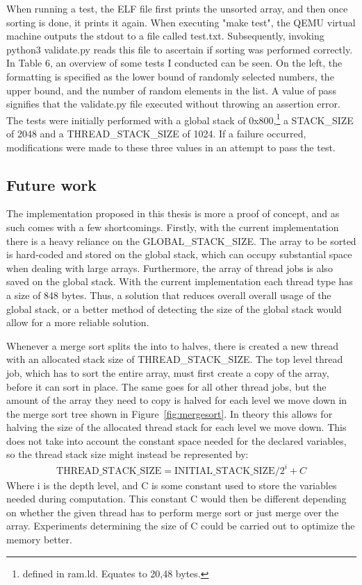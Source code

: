 When running a test, the ELF file first prints the unsorted array, and then once
sorting is done, it prints it again. When executing "make test", the QEMU
virtual machine outputs the stdout to a file called test.txt. Subsequently,
invoking python3 validate.py reads this file to ascertain if sorting was
performed correctly. In Table 6, an overview of some tests I conducted can be
seen. On the left, the formatting is specified as the lower bound of randomly
selected numbers, the upper bound, and the number of random elements in the
list. A value of pass signifies that the validate.py file executed without
throwing an assertion error. The tests were initially performed with a global
stack of 0x800,\footnote{defined in ram.ld. Equates to 20,48 bytes.} a
STACK\_SIZE of 2048 and a THREAD\_STACK\_SIZE of 1024. If a failure occurred,
modifications were made to these three values in an attempt to pass the test.

\subsection{Future work}
The implementation proposed in this thesis is more a proof of concept, and as
such comes with a few shortcomings. Firstly, with the current implementation
there is a heavy reliance on the GLOBAL\_STACK\_SIZE. The array to be sorted is
hard-coded and stored on the global stack, which can occupy substantial space
when dealing with large arrays. Furthermore, the array of thread jobs is also
saved on the global stack. With the current implementation each thread type has
a size of 848 bytes. Thus, a solution that reduces overall overall usage of the
global stack, or a better method of detecting the size of the global stack would
allow for a more reliable solution.

Whenever a merge sort splits the into to halves, there is created a new thread
with an allocated stack size of THREAD\_STACK\_SIZE. The top level thread job,
which has to sort the entire array, must first create a copy of the array, before
it can sort in place. The same goes for all other thread jobs, but the amount of
the array they need to copy is halved for each level we move down in the
merge sort tree shown in Figure~\ref{fig:mergesort}. In theory this allows for
halving the size of the allocated thread stack for each level we move down. This
does not take into account the constant space needed for the declared variables,
so the thread stack size might instead be represented by:
\begin{align}
  \text{THREAD\_STACK\_SIZE} = \text{INITIAL\_STACK\_SIZE} / 2^i + C
\end{align}
Where i is the depth level, and C is some constant used to store the variables
needed during computation. This constant C would then be different depending on
whether the given thread has to perform merge sort or just merge over the array.
Experiments determining the size of C could be carried out to optimize the
memory better.

